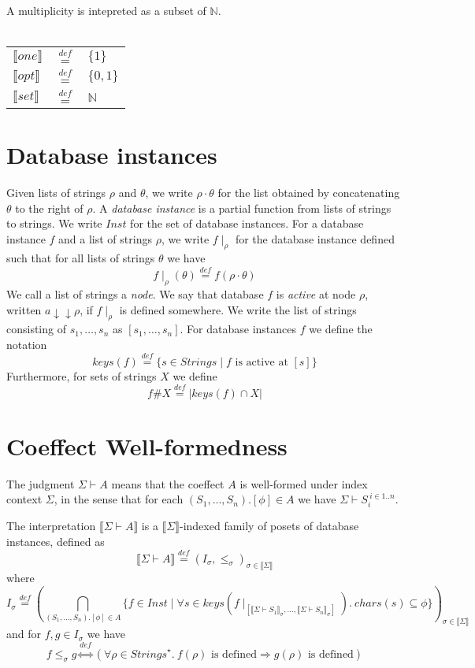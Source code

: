 \documentclass{article}
\newcommand{\sem}[1]{\llbracket #1 \rrbracket}
\newcommand{\defeq}{\overset{\mathit{def}}{=}}
\newcommand{\sdisp}[1]{
\left( #1 \right)
}
\begin{document}
A multiplicity is intepreted as a subset of $\mathbb N$.\\~\\
\begin{tabular}{lll}
$\sem{one}$ & $\defeq$ & $\{ 1 \}$ \\
$\sem{opt}$ & $\defeq$ & $\{ 0, 1 \}$ \\
$\sem{set}$ & $\defeq$ & $\mathbb N$
\end{tabular}
\section*{Database instances}

Given lists of strings $\rho$ and $\theta$, we write $\rho \cdot \theta$ for the list obtained by concatenating $\theta$ to the right of $\rho$. A \emph{database instance} is a partial function from lists of strings to strings. We write $\mathit{Inst}$ for the set of database instances. For a database instance $f$ and a list of strings $\rho$, we write $f \! \mid_\rho$ for the database instance defined such that for all lists of strings $\theta$ we have $$f \! \mid_\rho \! (\theta) \defeq f(\rho \cdot \theta)$$ We call a list of strings a \emph{node}. We say that database $f$ is \emph{active} at node $\rho$, written $a \downarrow \downarrow \rho$, if $f \! \mid_\rho$ is defined somewhere. We write the list of strings consisting of $s_1, \ldots, s_n$ as $[s_1,\ldots,s_n]$. For database instances $f$ we define the notation $$\mathit{keys}(f) \defeq \{ s \in \mathit{Strings} \mid f \text{ is active at } [s] \}$$ Furthermore, for sets of strings $X$ we define
$$f \# X \defeq | \mathit{keys}(f) \cap X |$$ 


\section*{Coeffect Well-formedness}

The judgment $\Sigma \vdash A$ means that the coeffect $A$ is well-formed under index context $\Sigma$,
in the sense that for each $(S_1,\ldots,S_n).[\phi] \in A$ we have $\Sigma \vdash S_i^{~i \in 1..n}$.

The interpretation $\sem{\Sigma \vdash A}$ is a $\sem{\Sigma}$-indexed family of posets of database instances, defined as $$\sem{\Sigma \vdash A} \defeq (I_\sigma, \leq_\sigma)_{\sigma \in \sem{\Sigma}}$$ where $$I_\sigma \defeq \sdisp{\bigcap_{(S_1,\ldots,S_n).[\phi] \in A} \{ f \in \mathit{Inst} \mid \forall s \in \mathit{keys}(f \! \mid_{[\sem{\Sigma \vdash S_1}_\sigma, \ldots, \sem{\Sigma \vdash S_n}_\sigma]}).~\mathit{chars}(s) \subseteq \phi \}}_{\sigma \in \sem{\Sigma}}$$ and for $f,g \in I_{\sigma}$ we have
$$f \leq_\sigma g \overset{\mathit{def}}{\Leftrightarrow} (\forall \rho \in \mathit{Strings}^\star.~f(\rho) \text{ is defined} \Rightarrow g(\rho) \text{ is defined})$$
 
\end{document}
